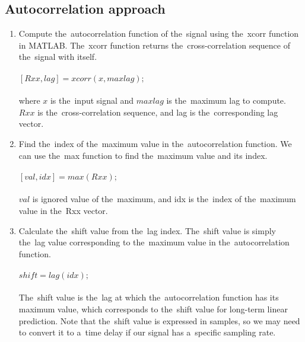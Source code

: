         \subsection{Autocorrelation approach} \label{subsec:acorr}
        \begin{enumerate}
            \item Compute the~autocorrelation function of the~signal using the~xcorr function in MATLAB.
           The~xcorr function returns the~cross-correlation sequence of the~signal with itself.\\
            \\
            $[Rxx, lag] = xcorr(x, maxlag);$\\
            \\
            where $x$ is the~input signal and $maxlag$ is the~maximum lag to compute. $Rxx$ is the~cross-correlation
            sequence, and lag is the~corresponding lag vector.
            \item Find the~index of the~maximum value in the~autocorrelation function. We can use the~max function to
            find the~maximum value and its index.\\
            \\
            $[val, idx] = max(Rxx);$\\
            \\
            $val$ is ignored value of the~maximum, and idx is the~index of the~maximum value in the~Rxx vector.
            \item Calculate the~shift value from the~lag index. The~shift value is simply the~lag value
            corresponding to the~maximum value in the~autocorrelation function.\\
            \\
            $shift = lag(idx);$\\
            \\
           The~shift value is the~lag at which the~autocorrelation function has its maximum value, which
            corresponds to the~shift value for long-term linear prediction. Note that the~shift value is expressed in
            samples, so we may need to convert it to a~time delay if our signal has a~specific sampling rate.
        \end{enumerate}
        \newpage
